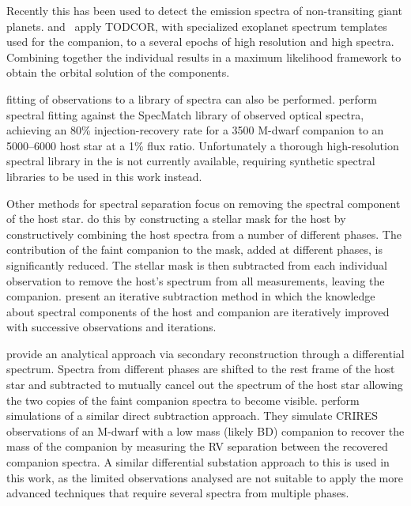 Recently this has been used to detect the emission spectra of non-transiting giant planets.
\citet{lockwood_nearir_2014} and~\citet{piskorz_evidence_2016} apply TODCOR, with specialized exoplanet spectrum templates used for the companion, to a several epochs of high resolution and high \snr{} \nir{} spectra.
Combining together the individual results in a maximum likelihood framework to obtain the orbital solution of the components.

\textchisquared{} fitting of observations to a library of spectra can also be performed.
\citet{kolbl_detection_2015} perform spectral fitting against the {SpecMatch} library of observed optical spectra, achieving an 80\% injection-recovery rate for a 3500\K{} {M-dwarf} companion to an 5000--6000\K{} host star at a 1\% flux ratio.
Unfortunately a thorough high-resolution spectral library in the \nir{} is not currently available, requiring synthetic spectral libraries to be used in this work instead.

Other methods for spectral separation focus on removing the spectral component of the host star.
\citet{rodler_weighing_2012} do this by constructing a stellar mask for the host by constructively combining the host spectra from a number of different phases.
The contribution of the faint companion to the mask, added at different phases, is significantly reduced.
The stellar mask is then subtracted from each individual observation to remove the host's spectrum from all measurements, leaving the companion.
\citet{gonzalez_separation_2006} present an iterative subtraction method in which the knowledge about spectral components of the host and companion are iteratively improved with successive observations and iterations.

\citet{ferluga_separating_1997} provide an analytical approach via secondary reconstruction through a differential spectrum.
Spectra from different phases are shifted to the rest frame of the host star and subtracted to mutually cancel out the spectrum of the host star allowing the two copies of the faint companion spectra to become visible.
\citet{kostogryz_spectral_2013} perform simulations of a similar direct subtraction approach.
They simulate CRIRES observations of an {M-dwarf} with a low mass (likely BD) companion to recover the mass of the companion by measuring the RV separation between the recovered companion spectra.
A similar differential substation approach to this is used in this work, as the limited observations analysed are not suitable to apply the more advanced techniques that require several spectra from multiple phases.
